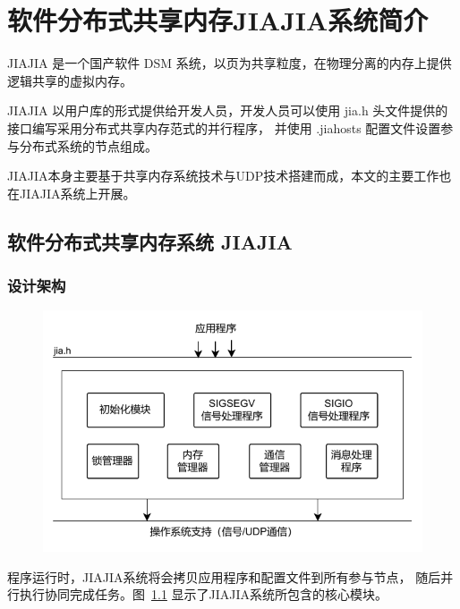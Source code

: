 \chapter{软件分布式共享内存JIAJIA系统简介}\label{chap:JIAJIA}{
    JIAJIA 是一个国产软件 DSM 系统，以页为共享粒度，在物理分离的内存上提供逻辑共享的虚拟内存。

    JIAJIA 以用户库的形式提供给开发人员，开发人员可以使用 jia.h 头文件提供的接口编写采用分布式共享内存范式的并行程序，
    并使用 .jiahosts 配置文件设置参与分布式系统的节点组成。

    JIAJIA本身主要基于共享内存系统技术与UDP技术搭建而成，本文的主要工作也在JIAJIA系统上开展。

    \section{软件分布式共享内存系统 JIAJIA}
    \subsection{设计架构}
    \begin{figure}[!htbp]
        \centering
        \includegraphics[width=\textwidth]{Img/JIAJIA 设计架构.drawio.pdf}
        \label{fig:JIAJIA-design}
    \end{figure}

    程序运行时，JIAJIA系统将会拷贝应用程序和配置文件到所有参与节点，
    随后并行执行协同完成任务。图~\ref{fig:JIAJIA-design} 显示了JIAJIA系统所包含的核心模块。

}
